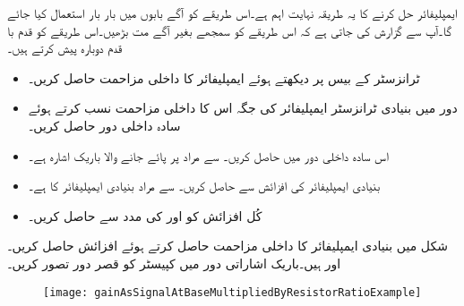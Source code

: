 ایمپلیفائر حل کرنے کا یہ طریقہ نہایت اہم ہے۔اس طریقے کو آگے بابوں میں بار بار استعمال کیا جائے گا۔آپ سے گزارش کی جاتی ہے کہ اس طریقے کو سمجھے بغیر آگے مت بڑھیں۔اس طریقے کو قدم با قدم دوبارہ پیش کرتے ہیں۔
\begin{itemize}
\item
ٹرانزسٹر کے بیس پر دیکھتے ہوئے ایمپلیفائر کا داخلی مزاحمت  حاصل کریں۔
\item
دور میں بنیادی ٹرانزسٹر ایمپلیفائر کی جگہ اس کا داخلی مزاحمت  نسب کرتے ہوئے سادہ داخلی دور حاصل کریں۔
\item
اس سادہ داخلی دور میں  حاصل کریں۔  سے مراد  پر پائے جانے والا باریک اشارہ ہے۔
\item
بنیادی ایمپلیفائر کی افزائش  سے حاصل کریں۔ سے مراد بنیادی ایمپلیفائر کا
  ہے۔
\item
کُل افزائش  کو  اور  کی مدد سے حاصل کریں۔
\end{itemize}
شکل  میں بنیادی ایمپلیفائر کا داخلی مزاحمت حاصل کرتے ہوئے افزائش  حاصل کریں۔ اور  ہیں۔باریک اشاراتی دور میں کپیسٹر کو قصر دور تصور کریں۔
\begin{figure}
\centering
\texttt{[image: gainAsSignalAtBaseMultipliedByResistorRatioExample]}
\caption{}
\label{شکل_ٹرانزسٹر_داخلی_مزاحمت_سے_افزائش}
\end{figure}


